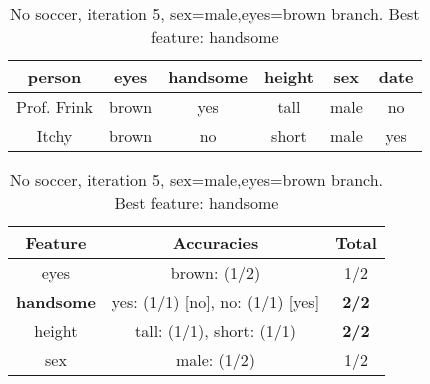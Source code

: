 \begin{table}[h!]
  \centering
  \begin{tabular}{ccccc|c}
    \toprule
    person      & eyes  & handsome & height & sex    & date\\
    \midrule
    Prof. Frink & brown & yes      & tall   & male   & no  \\
    Itchy       & brown & no       & short  & male   & yes \\
    \bottomrule
  \end{tabular}

  \vspace{.5cm}

  \begin{tabular}{ccc}
    \toprule
    Feature           & Accuracies                              & Total\\
    \midrule
    eyes              & brown: (1/2)                            & 1/2\\
    \textbf{handsome} & yes: (1/1) [no], no: (1/1) [yes]        & \textbf{2/2}\\
    height            & tall: (1/1), short: (1/1)               & \textbf{2/2}\\
    sex               & male: (1/2)                             & 1/2\\
    \bottomrule
  \end{tabular}
  \caption*{No soccer, iteration 5, sex=male,eyes=brown branch. Best feature: handsome}
\end{table}

